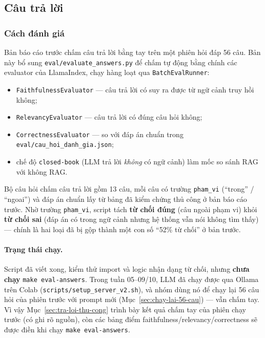\subsection{Câu trả lời}
\label{sec:danh-gia-tra-loi}

\subsubsection{Cách đánh giá}

Bản báo cáo trước chấm câu trả lời bằng tay trên một phiên hỏi đáp 56 câu. Bản này bổ sung
\texttt{eval/evaluate\_answers.py} để chấm tự động bằng chính các evaluator của LlamaIndex, chạy hàng
loạt qua \texttt{BatchEvalRunner}:

\begin{itemize}
  \item \texttt{FaithfulnessEvaluator} --- câu trả lời có suy ra được từ ngữ cảnh truy hồi không;
  \item \texttt{RelevancyEvaluator} --- câu trả lời có đúng câu hỏi không;
  \item \texttt{CorrectnessEvaluator} --- so với đáp án chuẩn trong \texttt{eval/cau\_hoi\_danh\_gia.json};
  \item chế độ \texttt{closed-book} (LLM trả lời \emph{không} có ngữ cảnh) làm mốc so sánh RAG với
        không RAG.
\end{itemize}

Bộ câu hỏi chấm câu trả lời gồm 13 câu, mỗi câu có trường \texttt{pham\_vi} (``trong'' / ``ngoai'')
và đáp án chuẩn lấy từ bảng đã kiểm chứng thủ công ở bản báo cáo trước. Nhờ trường \texttt{pham\_vi},
script tách \textbf{từ chối đúng} (câu ngoài phạm vi) khỏi \textbf{từ chối sai} (đáp án có trong ngữ
cảnh nhưng hệ thống vẫn nói không tìm thấy) --- chính là hai loại đã bị gộp thành một con số ``52\%
từ chối'' ở bản trước.

\paragraph{Trạng thái chạy.} Script đã viết xong, kiểm thử import và logic nhận dạng từ chối, nhưng
\textbf{chưa chạy} \texttt{make eval-answers}. Trong tuần 05--09/10, LLM đã chạy được qua Ollama trên
Colab (\texttt{scripts/setup\_server\_v2.sh}), và nhóm dùng nó để chạy lại 56 câu hỏi của phiên trước
với prompt mới (Mục~\ref{sec:chay-lai-56-cau}) --- vẫn chấm tay. Vì vậy Mục~\ref{sec:tra-loi-thu-cong}
trình bày kết quả chấm tay của phiên chạy trước (có ghi rõ nguồn), còn các bảng điểm
faithfulness/relevancy/correctness sẽ được điền khi chạy \texttt{make eval-answers}.

